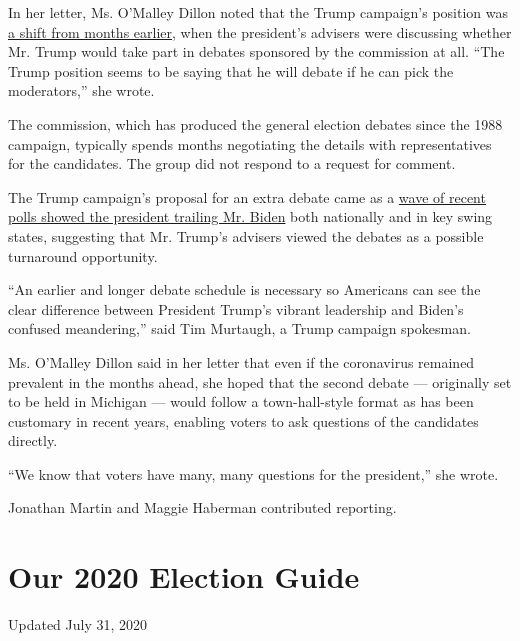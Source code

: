 In her letter, Ms. O'Malley Dillon noted that the Trump campaign's
position was
\href{https://www.nytimes.com/2019/12/12/us/politics/trump-presidential-debate-democrat.html}{a
shift from months earlier}, when the president's advisers were
discussing whether Mr. Trump would take part in debates sponsored by the
commission at all. ``The Trump position seems to be saying that he will
debate if he can pick the moderators,'' she wrote.

The commission, which has produced the general election debates since
the 1988 campaign, typically spends months negotiating the details with
representatives for the candidates. The group did not respond to a
request for comment.

The Trump campaign's proposal for an extra debate came as a
\href{https://www.nytimes.com/2020/06/09/upshot/polling-trump-erosion-support.html}{wave
of recent polls showed the president trailing Mr. Biden} both nationally
and in key swing states, suggesting that Mr. Trump's advisers viewed the
debates as a possible turnaround opportunity.

``An earlier and longer debate schedule is necessary so Americans can
see the clear difference between President Trump's vibrant leadership
and Biden's confused meandering,'' said Tim Murtaugh, a Trump campaign
spokesman.

Ms. O'Malley Dillon said in her letter that even if the coronavirus
remained prevalent in the months ahead, she hoped that the second debate
--- originally set to be held in Michigan --- would follow a
town-hall-style format as has been customary in recent years, enabling
voters to ask questions of the candidates directly.

``We know that voters have many, many questions for the president,'' she
wrote.

Jonathan Martin and Maggie Haberman contributed reporting.

\hypertarget{our-2020-election-guide}{%
\section{Our 2020 Election Guide}\label{our-2020-election-guide}}

Updated July 31, 2020


